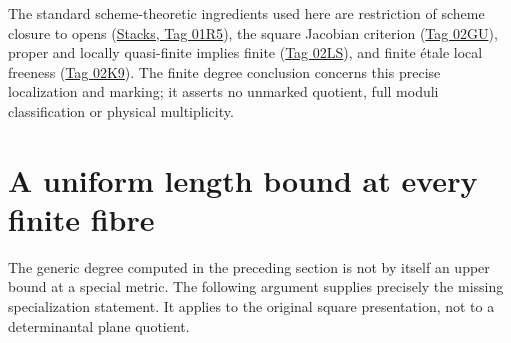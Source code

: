 \documentclass[11pt,a4paper]{article}
\theoremstyle{remark}\newtheorem{remark}[theorem]{Remark}
\begin{document}
The standard scheme-theoretic ingredients used here are restriction of
scheme closure to opens
(\href{https://stacks.math.columbia.edu/tag/01R5}{Stacks, Tag 01R5}),
the square Jacobian criterion
(\href{https://stacks.math.columbia.edu/tag/02GU}{Tag 02GU}),
proper and locally quasi-finite implies finite
(\href{https://stacks.math.columbia.edu/tag/02LS}{Tag 02LS}), and finite
\'etale local freeness
(\href{https://stacks.math.columbia.edu/tag/02K9}{Tag 02K9}). The finite
degree conclusion concerns this precise localization and marking; it
asserts no unmarked quotient, full moduli classification or physical
multiplicity.

\section{A uniform length bound at every finite fibre}
\label{length:section}

The generic degree computed in the preceding section is not by itself an
upper bound at a special metric. The following argument supplies precisely
the missing specialization statement. It applies to the original square
presentation, not to a determinantal plane quotient.
\end{document}
